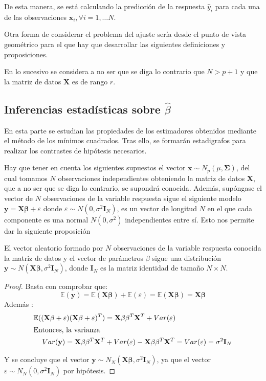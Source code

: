 \noindent De esta manera, se está calculando la predicción de la respuesta $\hat{y}_i$ para cada una de las observaciones $\mathbf{x}_i, \forall i =1, \ldots N$. 

\noindent Otra forma de considerar el problema del ajuste sería desde el punto de vista geométrico para el que hay que desarrollar las siguientes definiciones y proposiciones.

\noindent En lo sucesivo se considera a no ser que se diga lo contrario que $N>p+1$ y que la matriz de datos $\mathbf{X}$ es de rango $r$.


\subsection{Inferencias estadísticas sobre $\hat{\beta}$}

\noindent En esta parte se estudian las propiedades de los estimadores obtenidos mediante el método de los mínimos cuadrados. Tras ello, se formarán estadigrafos para realizar los contrastes de hipótesis necesarios.

\noindent Hay que tener en cuenta los siguientes supuestos el vector $\mathbf{x}\sim N_p(\mu, \mathbf{\Sigma})$, del cual tomamos $N$ observaciones independientes obteniendo la matriz de datos $\mathbf{X}$, que a no ser que se diga lo contrario, se supondrá conocida. Además, supóngase el vector de $N$ observaciones de la variable respuesta sigue el siguiente modelo $\mathbf{y}= \mathbf{X \beta}+\varepsilon$ donde $\varepsilon \sim N(0,\sigma^2\mathbf{I}_N)$, es un vector de longitud $N$ en el que cada componente es una normal $N(0,\sigma^2)$  independientes entre sí. Esto nos permite dar la siguiente proposición \cite{Cuadras 2014}
\begin{propo}
El vector aleatorio formado por $N$ observaciones de la variable respuesta conocida la matriz de datos y el vector de parámetros $\beta$ sigue una distribución
$\mathbf{y}\sim N(\mathbf{X\beta}, \sigma^2\mathbf{I}_N)$, donde $\mathbf{I}_N$ es la matriz identidad de tamaño $N \times N$.  
\begin{proof}
Basta con comprobar que:
\begin{equation}
\mathbb{E}(\mathbf{y})=\mathbb{E}(\mathbf{X\beta})+\mathbb{E}(\varepsilon)=\mathbb{E}(\mathbf{X\beta})=\mathbf{X\beta}
\end{equation}
Además :
\begin{align}
\mathbb{E}((\mathbf{X\beta}+\varepsilon)(\mathbf{X\beta}+\varepsilon)^T)&=\mathbf{X\beta}\mathbf{\beta}^T \mathbf{X}^T+ Var(\varepsilon
)\\
\intertext{Entonces, la varianza}
Var(\mathbf{y})=\mathbf{X\beta}\mathbf{\beta}^T \mathbf{X}^T&+ Var(\varepsilon
)-\mathbf{X\beta}\mathbf{\beta}^T \mathbf{X}^T=Var(\varepsilon)=\sigma^2\mathbf{I}_N
\end{align}

\noindent Y se concluye que el vector $\mathbf{y}\sim N_N(\mathbf{X\beta}, \sigma^2\mathbf{I}_N)$, ya que el vector $\varepsilon\sim N_N(0,\sigma^2 \mathbf{I}_N)$ por hipótesis. 
\end{proof}
\end{propo}

